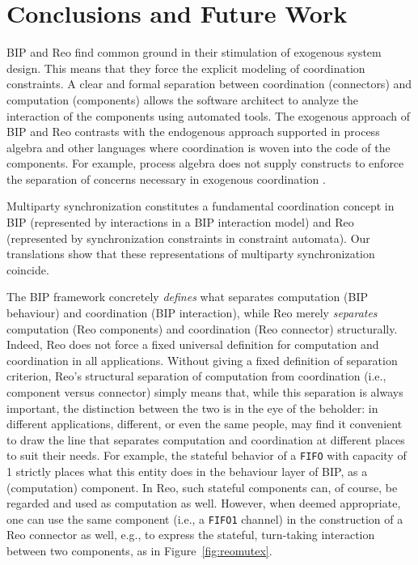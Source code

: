 \documentclass[submission,copyright,creativecommons,hidelinks]{eptcs}
\theoremstyle{plain} \newtheorem{theorem}{Theorem}
\theoremstyle{definition}
\theoremstyle{remark}
\newcommand{\fig}[2][]{Figure~\ref{fig:#2}\ensuremath{#1}}
\begin{document}
\section{Conclusions and Future Work}
\label{sec:conclusion}

BIP and Reo find common ground in their stimulation of exogenous system design. 
This means that they force the explicit modeling of coordination constraints. 
A clear and formal separation between coordination (connectors) and computation (components) allows the software architect to analyze the interaction of the components using automated tools. 
The exogenous approach of BIP and Reo contrasts with the endogenous approach supported in process algebra and other languages where coordination is woven into the code of the components. 
For example, process algebra does not supply constructs to enforce the separation of concerns necessary in exogenous coordination \cite{PA01}.

Multiparty synchronization constitutes a fundamental coordination concept in BIP (represented by interactions in a BIP interaction model) and Reo (represented by synchronization constraints in constraint automata). Our translations show that these representations of multiparty synchronization coincide.   

The BIP framework concretely \emph{defines} what separates computation (BIP behaviour) and coordination (BIP interaction), while Reo merely \emph{separates} computation (Reo components) and coordination (Reo connector) structurally. Indeed, Reo does not force a fixed universal definition for computation and coordination in all applications.  Without giving a fixed definition of separation criterion, Reo's structural separation of computation from coordination (i.e., component versus connector) simply means that, while this separation is always important, the distinction between the two is in the eye of the beholder: in different applications, different, or even the same people, may find it convenient to draw the line that separates computation and coordination at different places to suit their needs.  For example, the stateful behavior of a {\tt FIFO} with capacity of 1 strictly places what this entity does in the behaviour layer of BIP, as a (computation) component. In Reo, such stateful components can, of course, be regarded and used as computation as well. However, when deemed appropriate, one can use the same component (i.e., a {\tt FIFO1} channel) in the construction of a Reo connector as well, e.g., to express the stateful, turn-taking interaction between two components, as in \fig{reomutex}.
\end{document}
